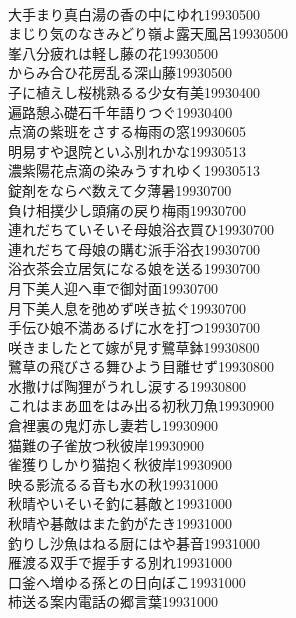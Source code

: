 \begin{multicols}{2}
\\大手まり真白湯の香の中にゆれ\hfill{19930500}
\\まじり気のなきみどり嶺よ露天風呂\hfill{19930500}
\\峯八分疲れは軽し藤の花\hfill{19930500}
\\からみ合ひ花房乱る深山藤\hfill{19930500}
\\子に植えし桜桃熟るる少女有美\hfill{19930400}
\\遍路憩ふ礎石千年語りつぐ\hfill{19930400}
\\点滴の紫班をさする梅雨の窓\hfill{19930605}
\\明易すや退院といふ別れかな\hfill{19930513}
\\濃紫陽花点滴の染みうすれゆく\hfill{19930513}
\\錠剤をならべ数えて夕薄暑\hfill{19930700}
\\負け相撲少し頭痛の戻り梅雨\hfill{19930700}
\\連れだちていそいそ母娘浴衣買ひ\hfill{19930700}
\\連れだちて母娘の購む派手浴衣\hfill{19930700}
\\浴衣茶会立居気になる娘を送る\hfill{19930700}
\\月下美人迎へ車で御対面\hfill{19930700}
\\月下美人息を弛めず咲き拡ぐ\hfill{19930700}
\\手伝ひ娘不満あるげに水を打つ\hfill{19930700}
\\咲きましたとて嫁が見す鷺草鉢\hfill{19930800}
\\鷺草の飛びさる舞ひよう目離せず\hfill{19930800}
\\水撒けば陶狸がうれし涙する\hfill{19930800}
\\これはまあ皿をはみ出る初秋刀魚\hfill{19930900}
\\倉裡裏の鬼灯赤し妻若し\hfill{19930900}
\\猫難の子雀放つ秋彼岸\hfill{19930900}
\\雀獲りしかり猫抱く秋彼岸\hfill{19930900}
\\映る影流るる音も水の秋\hfill{19931000}
\\秋晴やいそいそ釣に碁敵と\hfill{19931000}
\\秋晴や碁敵はまた釣がたき\hfill{19931000}
\\釣りし沙魚はねる厨にはや碁音\hfill{19931000}
\\雁渡る双手で握手する別れ\hfill{19931000}
\\口釜へ増ゆる孫との日向ぼこ\hfill{19931000}
\\柿送る案内電話の郷言葉\hfill{19931000}

\end{multicols}
